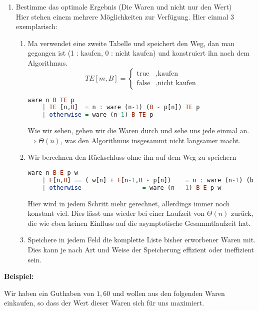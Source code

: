 \begin{enumerate}[\bfseries (1)]
\item Bestimme das optimale Ergebnis (Die Waren und nicht nur den Wert)\\

Hier stehen einem mehrere Möglichkeiten zur Verfügung. Hier einmal 3 exemplarisch:

\begin{enumerate}[\bfseries (a)]

\item Ma verwendet eine zweite Tabelle und speichert den Weg, dan man gegangen ist (1 : kaufen, 0 : nicht kaufen) und konstruiert ihn nach dem Algorithmus.
$$
TE[m,B] = \left\{ 
\begin{array}{lr}
\text{true} &, \text{kaufen}\\
\text{false} &, \text{nicht kaufen}
\end{array}
\right.
$$
\begin{lstlisting}[language=haskell]
ware n B TE p
	| TE [n,B]	= n : ware (n-1) (B - p[n]) TE p
	| otherwise	= ware (n-1) B TE p
\end{lstlisting}
Wie wir sehen, gehen wir die Waren durch und sehe uns jede einmal an.$\Rightarrow \Theta ( n )$, was den Algorithmus insgesammt nicht langsamer macht.

\item Wir berechnen den Rückschluss ohne ihn auf dem Weg zu speichern

\begin{lstlisting}[language=haskell]
ware n B E p w
	| E[n,B] == ( w[n] + E[n-1,B - p[n])	= n : ware (n-1) (b - p[n]) E p w
	| otherwise					= ware (n - 1) B E p w
\end{lstlisting}

Hier wird in jedem Schritt mehr gerechnet, allerdings immer noch konstant viel. Dies lässt uns wieder bei einer Laufzeit von $\Theta (n)$ zurück, die wie eben keinen Einfluss auf die asymptotische Gesammtlaufzeit hat.

\item Speichere in jedem Feld die komplette Liste bisher erworbener Waren mit. Dies kann je nach Art und Weise der Speicherung effizient oder ineffizient sein.

\end{enumerate}

\end{enumerate}

\textbf{Beispiel:}

Wir haben ein Guthaben von $1,60$ und wollen aus den folgenden Waren einkaufen, so dass der Wert dieser Waren sich für uns maximiert.\\

